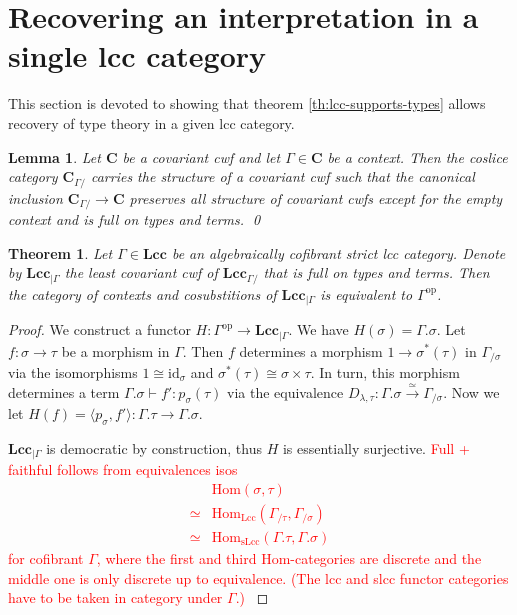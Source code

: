 \documentclass{article}
\newcommand{\todo}[1]{\textcolor{red}{#1}}
\newtheorem{theorem}{Theorem}
\newtheorem{lemma}{Lemma}
\theoremstyle{remark}
\theoremstyle{definition}
\begin{document}
\section{Recovering an interpretation in a single lcc category}

This section is devoted to showing that theorem \ref{th:lcc-supports-types} allows recovery of type theory in a given lcc category.

\begin{lemma}
  Let $\mathbf{C}$ be a covariant cwf and let $\Gamma \in \mathbf{C}$ be a context.
  Then the coslice category $\mathbf{C}_{\Gamma /}$ carries the structure of a covariant cwf such that the canonical inclusion $\mathbf{C}_{\Gamma /} \rightarrow \mathbf{C}$ preserves all structure of covariant cwfs except for the empty context and is full on types and terms.
  \qed
\end{lemma}

\begin{theorem}
  \label{th:context-as-model}
  Let $\Gamma \in \mathbf{Lcc}$ be an algebraically cofibrant strict lcc category.
  Denote by $\mathbf{Lcc}_{| \Gamma}$ the least covariant cwf of $\mathbf{Lcc}_{\Gamma /}$ that is full on types and terms.
  Then the category of contexts and cosubstitions of $\mathbf{Lcc}_{| \Gamma}$ is equivalent to $\Gamma^\mathrm{op}$.
\end{theorem}
\begin{proof}
  We construct a functor $H : \Gamma^\mathrm{op} \rightarrow \mathbf{Lcc}_{| \Gamma}$.
  We have $H(\sigma) = \Gamma.\sigma$.
  Let $f : \sigma \rightarrow \tau$ be a morphism in $\Gamma$.
  Then $f$ determines a morphism $1 \rightarrow \sigma^*(\tau)$ in $\Gamma_{/ \sigma}$ via the isomorphisms $1 \cong \mathrm{id}_\sigma$ and $\sigma^*(\tau) \cong \sigma \times \tau$.
  In turn, this morphism determines a term $\Gamma.\sigma \vdash f' : p_\sigma(\tau)$ via the equivalence $D_{\lambda, \tau} : \Gamma.\sigma \xrightarrow{\simeq} \Gamma_{/ \sigma}$.
  Now we let $H(f) = \langle p_\sigma, f' \rangle : \Gamma.\tau \rightarrow \Gamma.\sigma$.
  
  $\mathbf{Lcc}_{| \Gamma}$ is democratic by construction, thus $H$ is essentially surjective.
  \todo{
    Full + faithful follows from equivalences isos
    \begin{align}
      & \mathrm{Hom}(\sigma, \tau) \\
      \simeq {} & \mathrm{Hom}_\mathrm{Lcc}(\Gamma_{/ \tau} , \Gamma_{/ \sigma}) \\
      \simeq {} & \mathrm{Hom}_\mathrm{sLcc}(\Gamma.\tau, \Gamma.\sigma)
    \end{align}
    for cofibrant $\Gamma$, where the first and third Hom-categories are discrete and the middle one is only discrete up to equivalence.
    (The lcc and slcc functor categories have to be taken in category under $\Gamma$.)
  }
\end{proof}
\end{document}
